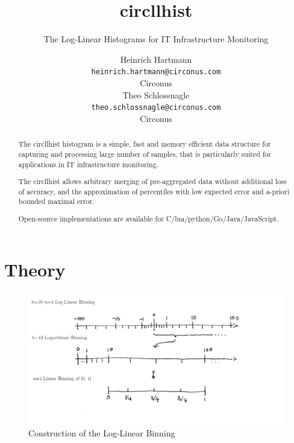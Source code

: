 \documentclass{article}
\title{circllhist}
\subtitle{The Log-Linear Histograms for IT Infrastructure Monitoring}
\author{
  Heinrich Hartmann \\
  \texttt{heinrich.hartmann@circonus.com} \\
  Circonus \\
  \And
  Theo Schlossnagle \\
  \texttt{theo.schlossnagle@circonus.com} \\
  Circonus
}
\theoremstyle{plain}
\theoremstyle{remark}
\begin{document}
\maketitle

\begin{abstract}
  The circllhist histogram is a simple, fast and memory efficient data structure for capturing
  and processing large number of samples, that is particularly suited for applications in
  IT infrastructure monitoring.

  The circllhist allows arbitrary merging of pre-aggregated data without additional loss of accuracy,
  and the approximation of percentiles with low expected error and a-priori bounded maximal error.

  Open-source implementations are available for C/lua/python/Go/Java/JavaScript.
\end{abstract}

\tableofcontents



\clearpage
\section{Theory}

\begin{figure}
  \includegraphics[width=\textwidth]{assets/LLBins.png}
  \caption{Construction of the Log-Linear Binning}
  \label{fig:llbins}
\end{figure}
\end{document}
